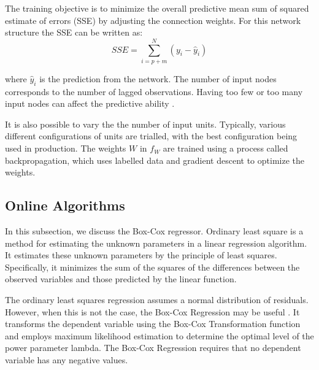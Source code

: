\documentclass[final,3p,times,twocolumn,numbers]{elsarticle}
\begin{document}
The training objective is to minimize the overall predictive mean sum of squared estimate of errors (SSE) by adjusting the connection weights. For this network structure the SSE can be written as:
\begin{equation}
SSE = \sum_{i=p+m}^N(y_i-\hat{y}_i)
\end{equation}

\noindent where $\hat{y}_i$ is the prediction from the network. The number of input nodes corresponds to the number of lagged observations. Having too few or too many input nodes can affect the predictive ability \cite{Pao2007}.

It is also possible to vary the the number of input units. Typically, various different configurations of units are trialled, with the best configuration being used in production. The weights $W$ in $f_W$ are trained using a process called backpropagation, which uses labelled data and gradient descent to optimize the weights.

\subsection{Online Algorithms}

 In this subsection, we discuss the Box-Cox regressor. Ordinary least square is a method for estimating the unknown parameters in a linear regression algorithm. It estimates these unknown parameters by the principle of least squares. Specifically, it minimizes the sum of the squares of the differences between the observed variables and those predicted by the linear function.

The ordinary least squares regression assumes a normal distribution of residuals. However, when this is not the case, the Box-Cox Regression may be useful \cite{Box1964}. It transforms the dependent variable using the Box-Cox Transformation function and employs maximum likelihood estimation to determine the optimal level of the power parameter lambda. The Box-Cox Regression requires that no dependent variable has any negative values.

\end{document}
